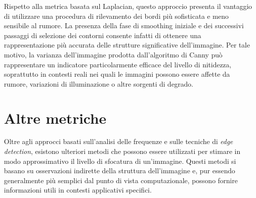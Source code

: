 \documentclass[
    target=bach,
    aauheader=,
    style=
]{thud}
\begin{document}
Rispetto alla metrica basata sul Laplacian, questo approccio presenta il vantaggio di utilizzare una procedura di rilevamento dei bordi più sofisticata e meno sensibile al rumore. La presenza della fase di smoothing iniziale e dei successivi passaggi di selezione dei contorni consente infatti di ottenere una rappresentazione più accurata delle strutture significative dell'immagine. Per tale motivo, la varianza dell'immagine prodotta dall'algoritmo di Canny può rappresentare un indicatore particolarmente efficace del livello di nitidezza, soprattutto in contesti reali nei quali le immagini possono essere affette da rumore, variazioni di illuminazione o altre sorgenti di degrado.

\section{Altre metriche}
\label{altre_metriche}

Oltre agli approcci basati sull'analisi delle frequenze e sulle tecniche di \textit{edge detection}, esistono ulteriori metodi che possono essere utilizzati per stimare in modo approssimativo il livello di sfocatura di un'immagine. Questi metodi si basano su osservazioni indirette della struttura dell'immagine e, pur essendo generalmente più semplici dal punto di vista computazionale, possono fornire informazioni utili in contesti applicativi specifici.
\end{document}
